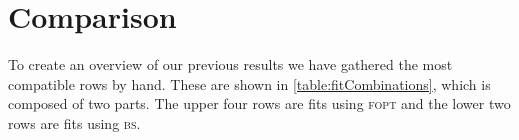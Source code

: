 \documentclass[../../index.tex]{subfiles}
\begin{document}
\section{Comparison}
To create an overview of our previous results we have gathered the most
compatible rows by hand. These are shown in \cref{table:fitCombinations}, which
is composed of two parts. The upper four rows are fits using \textsc{fopt} and
the lower two rows are fits using \textsc{bs}.
\begin{table}
  \centering {}
  \caption{Table of the best fits (selected by \(\chi^2/dof\) and compatibility of
    the fitting values) for each weight including at least the strong coupling
    \(\alpha_s(m_\tau^2)\) as a fitting variable. All fits have been performed
    using \textsc{fopt}, except weights marked with a star \(\omega^*\), which
    have been fitted using the \textit{Borel sum}.}
  \label{table:fitCombinations}
\end{table}
\end{document}

